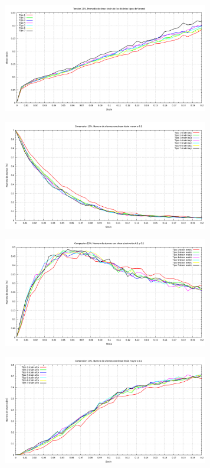 \documentclass[10pt, oneside]{article} %
\begin{document}
\begin{figure}[H]
\centering
\includegraphics[width=9cm]{Figures/Porosidad/Porosidad_ss_8.png}
\caption{}
\end{figure}

\begin{figure}[H]
\centering
\includegraphics[width=9cm]{Figures/Porosidad/Porosidad_ss_9.png}
\caption{}
\end{figure}

\begin{figure}[H]
\centering
\includegraphics[width=9cm]{Figures/Porosidad/Porosidad_ss_10.png}
\caption{}
\end{figure}

\begin{figure}[H]
\centering
\includegraphics[width=9cm]{Figures/Porosidad/Porosidad_ss_11.png}
\caption{}
\end{figure}
\end{document}
